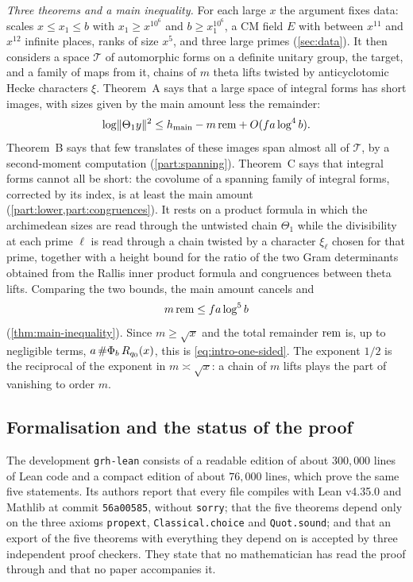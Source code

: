 \emph{Three theorems and a main inequality.} For each large $x$ the argument fixes data: scales
$x\le x_1\le b$ with $x_1\ge x^{10^6}$ and $b\ge x_1^{10^6}$, a CM field $E$ with between $x^{11}$ and $x^{12}$
infinite places, ranks of size $x^5$, and three large primes (\cref{sec:data}). It then considers a space $\mathcal T$
of automorphic forms on a definite unitary group, the target, and a family of maps from it, chains of
$m$ theta lifts twisted by anticyclotomic Hecke characters $\xi$. Theorem~A says that a large space of
integral forms has short images, with sizes given by the main amount less the remainder:
\[
  \log\lVert \Theta_1y\rVert^2\le h_{\mathrm{main}}-m\,\mathrm{rem}+O(fa\log^4b).
\]
Theorem~B says that few translates of these images span almost all of $\mathcal T$, by a second-moment
computation (\cref{part:spanning}). Theorem~C says that integral forms cannot all be short: the
covolume of a spanning family of integral forms, corrected by its index, is at least the main amount
(\cref{part:lower,part:congruences}). It rests on a product formula in which the archimedean sizes are
read through the untwisted chain $\Theta_1$ while the divisibility at each prime $\ell$ is read through
a chain twisted by a character $\xi_\ell$ chosen for that prime, together with a height bound for the
ratio of the two Gram determinants obtained from the Rallis inner product formula and congruences
between theta lifts. Comparing the two bounds, the main amount cancels and
\[
  m\,\mathrm{rem}\le fa\log^5b
\]
(\cref{thm:main-inequality}). Since $m\ge\sqrt x$ and the total remainder $\mathrm{rem}$ is, up to
negligible terms, $a\,\#\Phi_b\,R_{q_0}(x)$, this is \eqref{eq:intro-one-sided}. The exponent $1/2$
is the reciprocal of the exponent in $m\asymp\sqrt x$: a chain of $m$ lifts plays the part of
vanishing to order $m$.

\subsection{Formalisation and the status of the proof}\label{ss:intro-status}
The development \texttt{grh-lean} \cite{GRHLean2026} consists of a readable edition of about $300{,}000$
lines of Lean code and a compact edition of about $76{,}000$ lines, which prove the same five
statements. Its authors report that every file compiles with Lean v4.35.0 and Mathlib at commit
\texttt{56a00585}, without \texttt{sorry}; that the five theorems depend only on the three axioms
\texttt{propext}, \texttt{Classical.choice} and \texttt{Quot.sound}; and that an export of the five
theorems with everything they depend on is accepted by three independent proof checkers. They state
that no mathematician has read the proof through and that no paper accompanies it.

